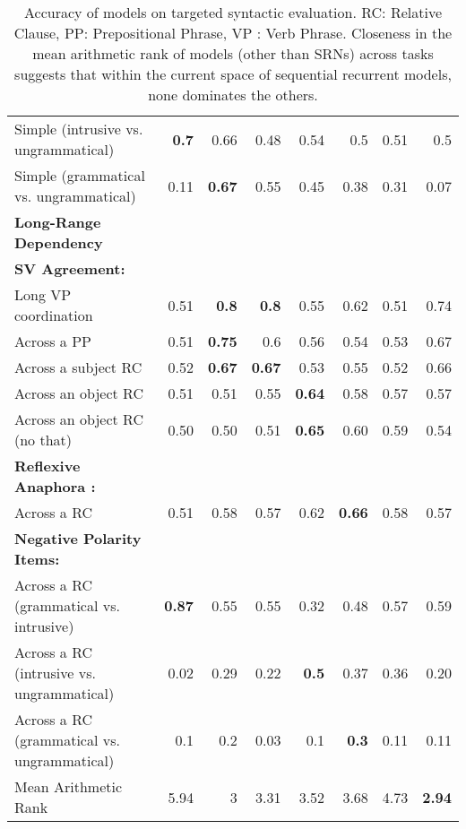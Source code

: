 \documentclass[11pt,a4paper]{article}
\begin{document}
\begin{table*}[ht]
{\begin{tabular}{l r r r r r r r}
        Simple (intrusive vs. ungrammatical) &\textbf{0.7}&0.66&0.48&0.54&0.5& 0.51 &0.5\\
        Simple (grammatical vs. ungrammatical) & 0.11&\textbf{0.67}&0.55&0.45&0.38&0.31&0.07 \\
        \hline 
        \hline 
        \textbf{Long-Range Dependency} \\
        \hline 
        \textbf{SV Agreement:} \\
        Long VP coordination &0.51&\textbf{0.8}&\textbf{0.8}&0.55&0.62& 0.51& 0.74\\
        Across a PP &0.51&\textbf{0.75}&0.6&0.56&0.54& 0.53& 0.67\\
        Across a subject RC &0.52&\textbf{0.67}&\textbf{0.67}&0.53&0.55&0.52&
        0.66 \\
        Across an object RC  & 0.51& 0.51& 0.55&\textbf{0.64}&0.58& 0.57&0.57\\
        Across an object RC (no that) &0.50&0.50&0.51&\textbf{0.65}&0.60& 0.59& 0.54\\
        \hline
        \textbf{Reflexive Anaphora :} \\
        Across a RC &0.51&0.58&0.57&0.62&\textbf{0.66}& 0.58& 0.57\\
        \hline
        \textbf{Negative Polarity Items:}\\
        Across a RC (grammatical vs. intrusive) &\textbf{0.87}&0.55&0.55&0.32&0.48&0.57&0.59 \\
        Across a RC (intrusive vs. ungrammatical) &0.02&0.29&0.22&\textbf{0.5}&0.37&0.36&0.20\\
        Across a RC (grammatical vs. ungrammatical) &0.1&0.2&0.03&0.1&\textbf{0.3}&0.11&0.11 \\
        \hline 
        \hline
        Mean Arithmetic Rank &5.94&3&3.31&3.52&3.68&4.73&\textbf{2.94}\\
    \end{tabular}}    \renewcommand\thetable{4}
    \caption{Accuracy of models on targeted syntactic evaluation. RC: Relative Clause, PP: Prepositional Phrase, VP : Verb Phrase. Closeness in the mean arithmetic rank of models (other than SRNs) across tasks suggests that within the current space of sequential recurrent models, none dominates the others.}
    \label{table: Targeted syntactic evaluation}
\end{table*}

\begin{table}[H]
\centering
{}
\renewcommand\thetable{3}
\caption{\label{Table: syn on gram} Accuracy comparison of DRNN and SDRNN when tested on the generalization set for the grammaticality judgement task; `anim' refers to an animated noun.}
\end{table}
\end{document}
